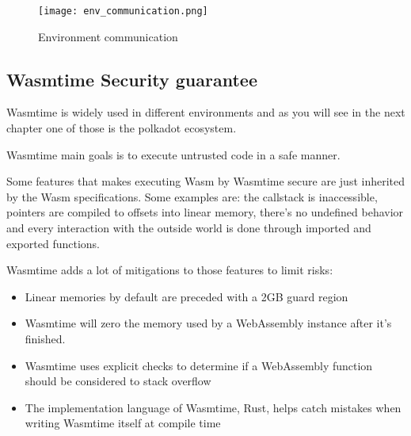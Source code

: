 \begin{figure}[h]
  \centering
  \texttt{[image: env\_communication.png]}
  \caption{Environment communication}
  \label{fig:env-communication}
\end{figure}

\subsection{Wasmtime Security guarantee}

Wasmtime is widely used in different environments and as you will see in the next chapter one of those is the polkadot ecosystem.

Wasmtime main goals is to execute untrusted code in a safe manner.~\cite{wasmtime-book}

Some features that makes executing Wasm by Wasmtime secure are just inherited by the Wasm specifications. Some examples are: the callstack is inaccessible, pointers are compiled to offsets into linear memory, there's no undefined behavior and every interaction with the outside world is done through imported and exported functions.~\cite{wasmtime-book}

Wasmtime adds  a lot of mitigations to those features to limit risks:
\begin{itemize}
  \item Linear memories by default are preceded with a 2GB guard region
  \item Wasmtime will zero the memory used by a WebAssembly instance after it's finished.
  \item Wasmtime uses explicit checks to determine if a WebAssembly function should be considered to stack overflow
  \item The implementation language of Wasmtime, Rust, helps catch mistakes when writing Wasmtime itself at compile time
\end{itemize}
